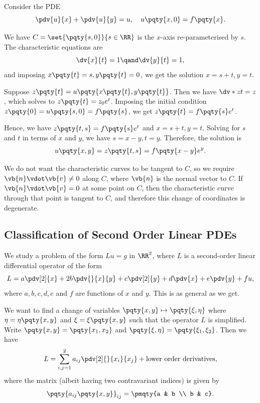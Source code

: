 \begin{example}
    Consider the PDE
    \begin{equation}
        \pdv{u}{x} + \pdv{u}{y} = u, \quad u\pqty{x, 0} = f\pqty{x}.
    \end{equation}

    We have \(C = \set{\pqty{s, 0}}{s \in \RR}\) is the \(x\)-axis re-parameterised by \(s\). The characteristic equations are
    \begin{equation}
        \dv{x}{t} = 1 \qand \dv{y}{t} = 1,
    \end{equation}
    and imposing \(x\pqty{t} = s, y\pqty{t} = 0\), we  get the solution \(x = s + t, y = t\).

    Suppose \(z\pqty{t} = u\pqty{x\pqty{t}, y\pqty{t}}\). Then we have \(\dv*{z}{t} = z\), which solves to \(z\pqty{t} = z_0 e^t\). Imposing the initial condition \(z\pqty{0} = u\pqty{s, 0} = f\pqty{s}\), we get \(z\pqty{t} = f\pqty{s} e^t\).

    Hence, we have \(z\pqty{t, s} = f\pqty{s} e^t\) and \(x = s + t, y = t\). Solving for \(s\) and \(t\) in terms of \(x\) and \(y\), we have \(s = x - y, t = y\). Therefore, the solution is
    \begin{equation}
        u\pqty{x, y} = z\pqty{t, s} = f\pqty{x - y} e^y.
    \end{equation}
\end{example}

We do not want the characteristic curves to be tangent to \(C\), so we require \(\vb{n} \vdot \vb{v} \neq 0\) along \(C\), where \(\vb{n}\) is the normal vector to \(C\). If \(\vb{n} \vdot \vb{v} = 0\) at some point on \(C\), then the characteristic curve through that point is tangent to \(C\), and therefore this change of coordinates is degenerate.

\subsection{Classification of Second Order Linear PDEs}

We study a problem of the form \(L u = g\) in \(\RR^2\), where \(L\) is a second-order linear differential operator of the form
\begin{equation}
    L = a \pdv[2]{x} + 2 b \pdv{}{x}{y} + c \pdv[2]{y} + d \pdv{x} + e \pdv{y} + f u,
\end{equation}
where \(a, b, c, d, e\) and \(f\) are functions of \(x\) and \(y\). This is as general as we get.

We want to find a change of variables \(\pqty{x, y} \mapsto \pqty{\xi, \eta}\) where \(\eta = \eta\pqty{x, y}\) and \(\xi = \xi\pqty{x, y}\) such that the operator \(L\) is simplified. Write \(\pqty{x, y} = \pqty{x_1, x_2}\) and \(\pqty{\xi, \eta} = \pqty{\xi_1, \xi_2}\). Then we have
\begin{equation}
    L = \sum_{i, j = 1}^{2} a_{ij} \pdv[2]{}{x_i}{x_j} + \text{lower order derivatives},
\end{equation}
where the matrix (albeit having two contravariant indices) is given by
\[
    \pqty{a_{ij} \pqty{x, y}}_{ij} = \pmqty{a & b \\ b & c}.
\]

